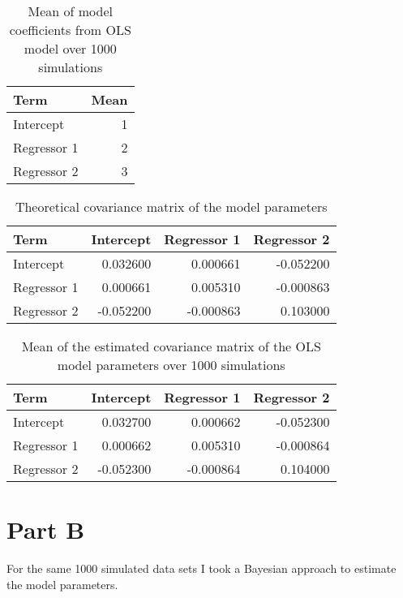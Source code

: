 \documentclass[]{book}
\begin{document}
\begin{table}

\caption{\label{tab:lm-mean-coefs-q3}Mean of model coefficients from OLS model over 1000 simulations}
\centering
\begin{tabular}[t]{lr}
\toprule
Term & Mean\\
\midrule
Intercept & 1\\
Regressor 1 & 2\\
Regressor 2 & 3\\
\bottomrule
\end{tabular}
\end{table}

\begin{table}

\caption{\label{tab:theory-vcov-q3}Theoretical covariance matrix of the model parameters}
\centering
\begin{tabular}[t]{lrrr}
\toprule
Term & Intercept & Regressor 1 & Regressor 2\\
\midrule
Intercept & 0.032600 & 0.000661 & -0.052200\\
Regressor 1 & 0.000661 & 0.005310 & -0.000863\\
Regressor 2 & -0.052200 & -0.000863 & 0.103000\\
\bottomrule
\end{tabular}
\end{table}

\begin{table}

\caption{\label{tab:lm-est-vcov-q3}Mean of the estimated covariance matrix of the OLS model parameters over 1000 simulations}
\centering
\begin{tabular}[t]{lrrr}
\toprule
Term & Intercept & Regressor 1 & Regressor 2\\
\midrule
Intercept & 0.032700 & 0.000662 & -0.052300\\
Regressor 1 & 0.000662 & 0.005310 & -0.000864\\
Regressor 2 & -0.052300 & -0.000864 & 0.104000\\
\bottomrule
\end{tabular}
\end{table}

\hypertarget{part-b-2}{%
\section{Part B}\label{part-b-2}}

For the same 1000 simulated data sets I took a Bayesian approach to estimate the model parameters.
\end{document}
